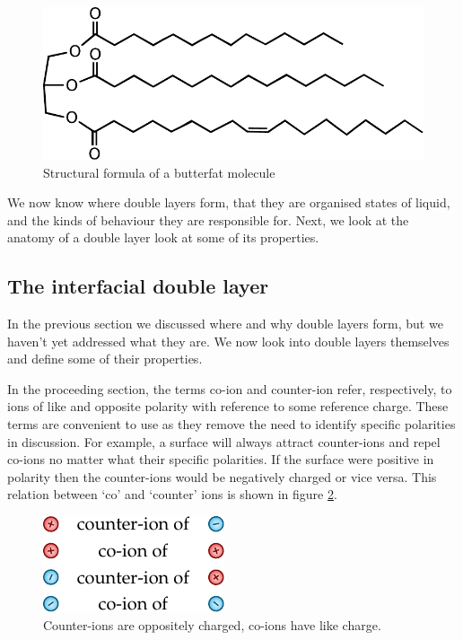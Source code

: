     \begin{figure}
        \begin{center}
            \includegraphics[scale=0.8]{content/introduction/graphics/butterfat}
        \end{center}
        \caption{Structural formula of a butterfat molecule}
        \label{fig:butterfat}
    \end{figure}

    We now know where double layers form, that they are organised states of liquid, and the kinds of behaviour they are responsible for.
    Next, we look at the anatomy of a double layer look at some of its properties.

  \subsection{The interfacial double layer}

    In the previous section we discussed where and why double layers form, but we haven't yet addressed what they are.
    We now look into double layers themselves and define some of their properties.

    In the proceeding section, the terms co-ion and counter-ion refer, respectively, to ions of like and opposite polarity with reference to some reference charge.
    These terms are convenient to use as they remove the need to identify specific polarities in discussion.
    For example, a surface will always attract counter-ions and repel co-ions no matter what their specific polarities.
    If the surface were positive in polarity then the counter-ions would be negatively charged or vice versa.
    This relation between `co' and `counter' ions is shown in figure \ref{fig:counterAndCoIons}.

    \begin{figure}
      \begin{center}
        \includegraphics{content/introduction/graphics/counterAndCoIons}
      \end{center}
      \caption{Counter-ions are oppositely charged, co-ions have like charge.}
      \label{fig:counterAndCoIons}
    \end{figure}

